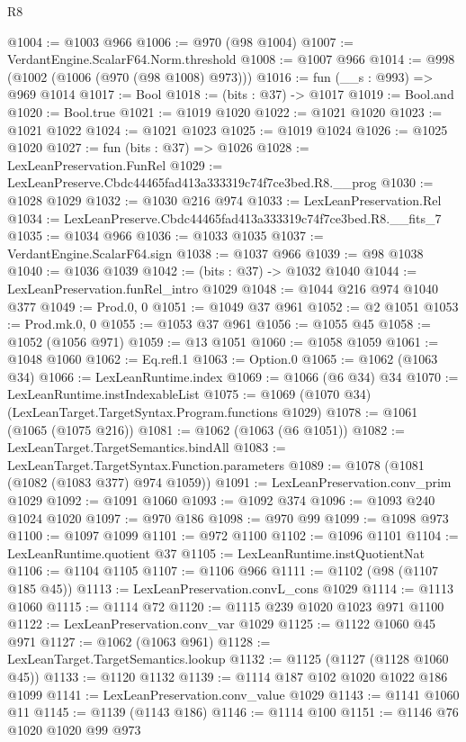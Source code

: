 \begin{lexlean}{R8}
\begin{coremodule}
@1004 := @1003 @966
@1006 := @970 (@98 @1004)
@1007 := VerdantEngine.ScalarF64.Norm.threshold
@1008 := @1007 @966
@1014 := @998 (@1002 (@1006 (@970 (@98 @1008) @973)))
@1016 := fun (__s : @993) => @969 @1014
@1017 := Bool
@1018 := (bits : @37) -> @1017
@1019 := Bool.and
@1020 := Bool.true
@1021 := @1019 @1020
@1022 := @1021 @1020
@1023 := @1021 @1022
@1024 := @1021 @1023
@1025 := @1019 @1024
@1026 := @1025 @1020
@1027 := fun (bits : @37) => @1026
@1028 := LexLeanPreservation.FunRel
@1029 := LexLeanPreserve.Cbdc44465fad413a333319c74f7ce3bed.R8.__prog
@1030 := @1028 @1029
@1032 := @1030 @216 @974
@1033 := LexLeanPreservation.Rel
@1034 := LexLeanPreserve.Cbdc44465fad413a333319c74f7ce3bed.R8.__fits_7
@1035 := @1034 @966
@1036 := @1033 @1035
@1037 := VerdantEngine.ScalarF64.sign
@1038 := @1037 @966
@1039 := @98 @1038
@1040 := @1036 @1039
@1042 := (bits : @37) -> @1032 @1040
@1044 := LexLeanPreservation.funRel_intro @1029
@1048 := @1044 @216 @974 @1040 @377
@1049 := Prod.{0, 0}
@1051 := @1049 @37 @961
@1052 := @2 @1051
@1053 := Prod.mk.{0, 0}
@1055 := @1053 @37 @961
@1056 := @1055 @45
@1058 := @1052 (@1056 @971)
@1059 := @13 @1051
@1060 := @1058 @1059
@1061 := @1048 @1060
@1062 := Eq.refl.{1}
@1063 := Option.{0}
@1065 := @1062 (@1063 @34)
@1066 := LexLeanRuntime.index
@1069 := @1066 (@6 @34) @34
@1070 := LexLeanRuntime.instIndexableList
@1075 := @1069 (@1070 @34) (LexLeanTarget.TargetSyntax.Program.functions @1029)
@1078 := @1061 (@1065 (@1075 @216))
@1081 := @1062 (@1063 (@6 @1051))
@1082 := LexLeanTarget.TargetSemantics.bindAll
@1083 := LexLeanTarget.TargetSyntax.Function.parameters
@1089 := @1078 (@1081 (@1082 (@1083 @377) @974 @1059))
@1091 := LexLeanPreservation.conv_prim @1029
@1092 := @1091 @1060
@1093 := @1092 @374
@1096 := @1093 @240 @1024 @1020
@1097 := @970 @186
@1098 := @970 @99
@1099 := @1098 @973
@1100 := @1097 @1099
@1101 := @972 @1100
@1102 := @1096 @1101
@1104 := LexLeanRuntime.quotient @37
@1105 := LexLeanRuntime.instQuotientNat
@1106 := @1104 @1105
@1107 := @1106 @966
@1111 := @1102 (@98 (@1107 @185 @45))
@1113 := LexLeanPreservation.convL_cons @1029
@1114 := @1113 @1060
@1115 := @1114 @72
@1120 := @1115 @239 @1020 @1023 @971 @1100
@1122 := LexLeanPreservation.conv_var @1029
@1125 := @1122 @1060 @45 @971
@1127 := @1062 (@1063 @961)
@1128 := LexLeanTarget.TargetSemantics.lookup
@1132 := @1125 (@1127 (@1128 @1060 @45))
@1133 := @1120 @1132
@1139 := @1114 @187 @102 @1020 @1022 @186 @1099
@1141 := LexLeanPreservation.conv_value @1029
@1143 := @1141 @1060 @11
@1145 := @1139 (@1143 @186)
@1146 := @1114 @100
@1151 := @1146 @76 @1020 @1020 @99 @973

\end{coremodule}
\end{lexlean}
